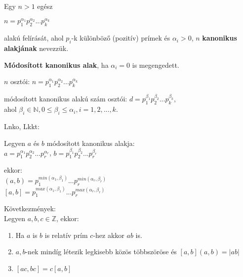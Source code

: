 \begin{frame}
  \begin{tcolorbox}[title={Def.: Kanonikus alak, Módosított kanonikus alak}]
    Egy $n > 1$ egész\\
    \mmedskip

    $n = p_1^{{\alpha_1}}p_2^{{\alpha_2}}...p_k^{{\alpha_k}}$\\
    \mmedskip

    alakú felírását, ahol $p_i$-k különböző (pozitív) prímek és ${\alpha}_i > 0$, $n$ \textbf{kanonikus alakjának} nevezzük.\\
    \mmedskip

    \textbf{Módosított kanonikus alak}, ha ${\alpha}_i = 0$ is megengedett.
  \end{tcolorbox}

  \begin{tcolorbox}[title={Ész}]
    $n$ osztói: $n = p_1^{{\alpha_1}}p_2^{{\alpha_2}}...p_k^{{\alpha_k}}$\\
    \mmedskip

    módosított kanonikus alakú szám osztói: $d = p_1^{{\beta}_1}p_2^{{\beta}_2}...p_k^{{\beta}_k}$,\\
    ahol ${\beta}_i \in \mathbb{N}, 0 \leq {\beta}_i \leq {\alpha}_i, i = 1, 2, ..., k$.\\
    \mmedskip

    Lnko, Lkkt:\\
    \mmedskip

    Legyen $a$ és $b$ módosított kanonikus alakja:\\
    $a = p_1^{{\alpha}_1}p_2^{{\alpha}_2}...p_r^{{\alpha}_r}$, $b = p_1^{{\beta}_1}p_2^{{\beta}_2}...p_r^{{\beta}_r}$\\
    \mmedskip

    ekkor:\\
    $(a, b) = p_1^{min({\alpha}_1, {\beta}_1)}...p_r^{min({\alpha}_r, {\beta}_r)}$\\
    $[a, b] = p_1^{max({\alpha}_1, {\beta}_1)}...p_r^{max({\alpha}_r, {\beta}_r)}$\\
    \mbigskip

    Következmények:\\
    Legyen $a, b, c \in \mathbb{Z}$, ekkor:\\
    \begin{enumerate}
      \item Ha $a$ is $b$ is relatív prím $c$-hez akkor $ab$ is.
      \item $a, b$-nek mindíg létezik legkisebb közös többszöröse és $[a, b](a, b) = |ab|$
      \item $[ac, bc] = c[a, b]$
    \end{enumerate}
  \end{tcolorbox}
\end{frame}

